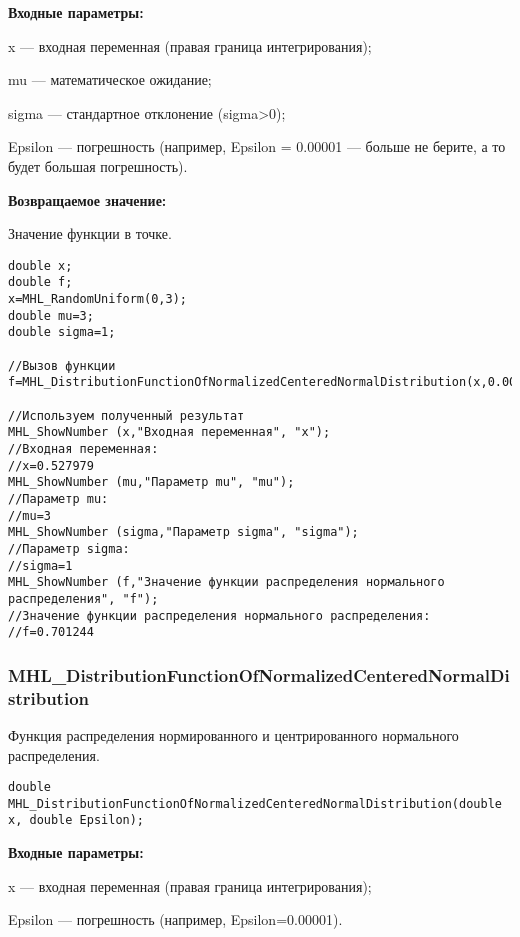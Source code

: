 \documentclass[a4paper,12pt]{article}
\begin{document}
\textbf{Входные параметры:}

 x --- входная переменная (правая граница интегрирования);
 
mu --- математическое ожидание;
 
sigma --- стандартное отклонение (sigma>0);
 
Epsilon --- погрешность (например, Epsilon = 0.00001 --- больше не берите, а то будет большая погрешность).

\textbf{Возвращаемое значение:}

 Значение функции в точке.
 



\begin{lstlisting}[label=code_use_MHL_DistributionFunctionOfNormalDistribution,caption=Пример использования]
double x;
double f;
x=MHL_RandomUniform(0,3);
double mu=3;
double sigma=1;

//Вызов функции
f=MHL_DistributionFunctionOfNormalizedCenteredNormalDistribution(x,0.001);

//Используем полученный результат
MHL_ShowNumber (x,"Входная переменная", "x");
//Входная переменная:
//x=0.527979
MHL_ShowNumber (mu,"Параметр mu", "mu");
//Параметр mu:
//mu=3
MHL_ShowNumber (sigma,"Параметр sigma", "sigma");
//Параметр sigma:
//sigma=1
MHL_ShowNumber (f,"Значение функции распределения нормального распределения", "f");
//Значение функции распределения нормального распределения:
//f=0.701244
\end{lstlisting}

\subsubsection{MHL\_DistributionFunctionOfNormalizedCenteredNormalDistribution}\label{MHL_DistributionFunctionOfNormalizedCenteredNormalDistribution}

Функция распределения нормированного и центрированного нормального распределения.


\begin{lstlisting}[label=code_syntax_MHL_DistributionFunctionOfNormalizedCenteredNormalDistribution,caption=Синтаксис]
double MHL_DistributionFunctionOfNormalizedCenteredNormalDistribution(double x, double Epsilon);
\end{lstlisting}

\textbf{Входные параметры:}

 x --- входная переменная (правая граница интегрирования);
 
 Epsilon --- погрешность (например, Epsilon=0.00001).
\end{document}

